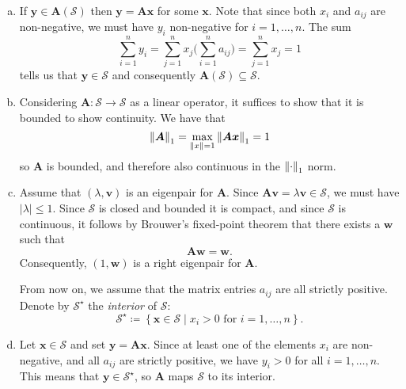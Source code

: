 \documentclass[12pt, oneside, article, a4paper]{memoir}
\newcommand{\mat}[1]{\bm{#1}}
\begin{document}
\begin{enumerate}[a)]
    \item If \( \mat{y} \in \mat{A}(\mathcal{S}) \) then \( \mat{y} = \mat{Ax}
        \) for some \( \mat{x} \). Note that since both \( x_i \) and \( a_{ij}
        \) are non-negative, we must have \( y_i \) non-negative for \( i = 1,
        \ldots, n \). The sum
        \begin{equation}
            \sum_{i=1}^n y_i = \sum_{j=1}^n x_{j} \Big(\sum^{n}_{i=1}
            a_{ij}\Big) = \sum_{j=1}^n x_j = 1
        \end{equation}
        tells us that \( \mat{y} \in \mathcal{S} \) and consequently \(
        \mat{A}(\mathcal{S}) \subseteq \mathcal{S} \).

    \item Considering \( \mat{A} \colon \mathcal{S} \to \mathcal{S} \) as a
        linear operator, it suffices to show that it is bounded to show
        continuity. We have that
        \begin{equation}
            \norm{\mat{A}}_1 = \max_{\norm{x} = 1}\norm{\mat{Ax}}_1 = 1
        \end{equation}
        so \( \mat{A} \) is bounded, and therefore also continuous in the \(
        \norm{\cdot}_1 \) norm.

    \item Assume that \( (\lambda, \mat{v}) \) is an eigenpair for \( \mat{A}
        \). Since \( \mat{Av} = \lambda \mat{v} \in \mathcal{S} \), we must
        have \( |\lambda| \leq 1 \). Since \( \mathcal{S} \) is closed and
        bounded it is compact, and since \( \mathcal{S} \) is continuous, it
        follows by Brouwer's fixed-point theorem that there exists a  \(
        \mat{w} \) such that
        \begin{equation}
            \mat{Aw} = \mat{w}.
        \end{equation}
        Consequently, \( (1, \mat{w}) \) is a right eigenpair for \( \mat{A}
        \).

        From now on, we assume that the matrix entries \( a_{ij}  \) are all
        strictly positive. Denote by \( \mathcal{S}^\star \) the
        \emph{interior} of \( \mathcal{S} \):
        \begin{equation}
            \mathcal{S}^\star \coloneqq \left\{ \mat{x} \in \mathcal{S}  \mid
            x_i > 0 \text{ for  } i = 1, \ldots, n\right\}.
        \end{equation}

    \item Let \( \mat{x} \in \mathcal{S} \) and set \( \mat{y} = \mat{Ax} \).
        Since at least one of the elements \( x_i \) are non-negative, and all
        \( a_{ij} \) are strictly positive, we have \( y_i > 0\) for all \( i =
        1, \ldots, n \). This means that \(\mat{y} \in \mathcal{S}^\star \), so \(
        \mat{A} \) maps \( \mathcal{S} \) to its interior.


\end{enumerate}
\end{document}
